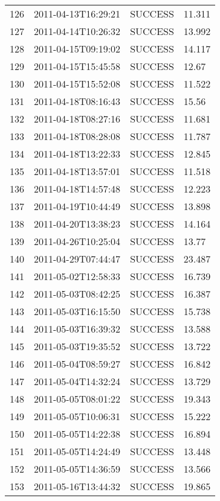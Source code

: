 \begin{tabularx}{\textwidth}{p{1cm} p{3cm} p{2cm} X}
 126 & 2011-04-13T16:29:21 & SUCCESS & 11.311 \\
 127 & 2011-04-14T10:26:32 & SUCCESS & 13.992 \\
 128 & 2011-04-15T09:19:02 & SUCCESS & 14.117 \\
 129 & 2011-04-15T15:45:58 & SUCCESS & 12.67 \\
 130 & 2011-04-15T15:52:08 & SUCCESS & 11.522 \\
 131 & 2011-04-18T08:16:43 & SUCCESS & 15.56 \\
 132 & 2011-04-18T08:27:16 & SUCCESS & 11.681 \\
 133 & 2011-04-18T08:28:08 & SUCCESS & 11.787 \\
 134 & 2011-04-18T13:22:33 & SUCCESS & 12.845 \\
 135 & 2011-04-18T13:57:01 & SUCCESS & 11.518 \\
 136 & 2011-04-18T14:57:48 & SUCCESS & 12.223 \\
 137 & 2011-04-19T10:44:49 & SUCCESS & 13.898 \\
 138 & 2011-04-20T13:38:23 & SUCCESS & 14.164 \\
 139 & 2011-04-26T10:25:04 & SUCCESS & 13.77 \\
 140 & 2011-04-29T07:44:47 & SUCCESS & 23.487 \\
 141 & 2011-05-02T12:58:33 & SUCCESS & 16.739 \\
 142 & 2011-05-03T08:42:25 & SUCCESS & 16.387 \\
 143 & 2011-05-03T16:15:50 & SUCCESS & 15.738 \\
 144 & 2011-05-03T16:39:32 & SUCCESS & 13.588 \\
 145 & 2011-05-03T19:35:52 & SUCCESS & 13.722 \\
 146 & 2011-05-04T08:59:27 & SUCCESS & 16.842 \\
 147 & 2011-05-04T14:32:24 & SUCCESS & 13.729 \\
 148 & 2011-05-05T08:01:22 & SUCCESS & 19.343 \\
 149 & 2011-05-05T10:06:31 & SUCCESS & 15.222 \\
 150 & 2011-05-05T14:22:38 & SUCCESS & 16.894 \\
 151 & 2011-05-05T14:24:49 & SUCCESS & 13.448 \\
 152 & 2011-05-05T14:36:59 & SUCCESS & 13.566 \\
 153 & 2011-05-16T13:44:32 & SUCCESS & 19.865 \\
 \bottomrule
\end{tabularx}

